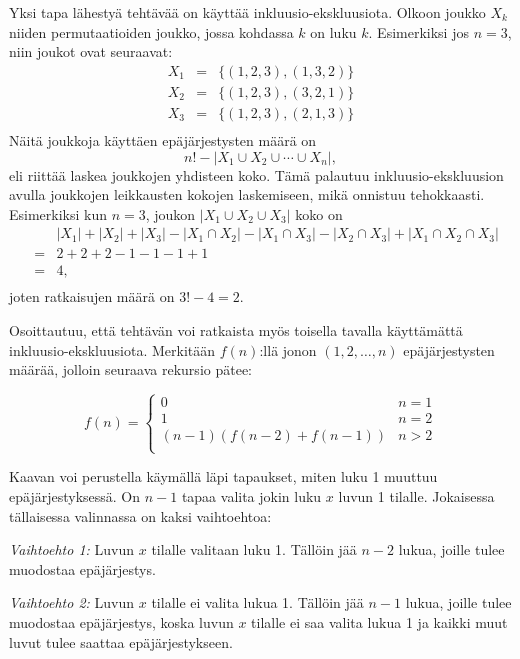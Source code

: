 Yksi tapa lähestyä tehtävää on käyttää inkluusio-ekskluusiota.
Olkoon joukko $X_k$ niiden permutaatioiden joukko,
jossa kohdassa $k$ on luku $k$.
Esimerkiksi jos $n=3$, niin joukot ovat seuraavat:
\[
\begin{array}{lcl}
X_1 & = & \{(1,2,3),(1,3,2)\} \\
X_2 & = & \{(1,2,3),(3,2,1)\} \\
X_3 & = & \{(1,2,3),(2,1,3)\} \\
\end{array}
\]
Näitä joukkoja käyttäen epäjärjestysten määrä on
\[ n! - |X_1 \cup X_2 \cup \cdots \cup X_n|, \]
eli
riittää laskea joukkojen yhdisteen koko.
Tämä palautuu inkluusio-eks\-kluu\-sion avulla
joukkojen leikkausten kokojen laskemiseen,
mikä onnistuu tehokkaasti.
Esimerkiksi kun $n=3$, joukon $|X_1 \cup X_2 \cup X_3|$ koko on
\[
\begin{array}{lcl}
 & & |X_1| + |X_2| + |X_3| - |X_1 \cap X_2|  - |X_1 \cap X_3|  - |X_2 \cap X_3| + |X_1 \cap X_2 \cap X_3| \\
 & = & 2+2+2-1-1-1+1 \\
 & = & 4, \\
\end{array}
\]
joten ratkaisujen määrä on $3!-4=2$.

Osoittautuu, että tehtävän voi ratkaista myös toisella
tavalla käyttämättä inkluusio-ekskluusiota.
Merkitään $f(n)$:llä jonon $(1,2,\ldots,n)$ epäjärjestysten määrää,
jolloin seuraava rekursio pätee:

\begin{equation*}
    f(n) = \begin{cases}
               0               & n = 1\\
               1               & n = 2\\
               (n-1)(f(n-2) + f(n-1)) & n>2 \\
           \end{cases}
\end{equation*}

Kaavan voi perustella käymällä läpi tapaukset,
miten luku 1 muuttuu epäjärjestyksessä.
On $n-1$ tapaa valita jokin luku $x$ luvun 1 tilalle.
Jokaisessa tällaisessa valinnassa on kaksi vaihtoehtoa:

\textit{Vaihtoehto 1:} Luvun $x$ tilalle valitaan luku 1.
Tällöin jää $n-2$ lukua, joille tulee muodostaa epäjärjestys.

\textit{Vaihtoehto 2:} Luvun $x$ tilalle ei valita lukua 1.
Tällöin jää $n-1$ lukua, joille tulee muodostaa epäjärjestys,
koska luvun $x$ tilalle ei saa valita lukua 1
ja kaikki muut luvut tulee saattaa epäjärjestykseen.

